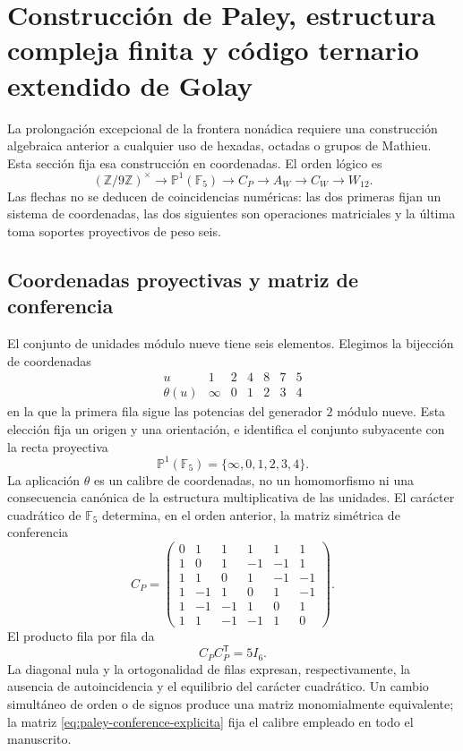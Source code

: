 \chapter{Construcción de Paley, estructura compleja finita y código ternario
extendido de Golay}
\label{chap:paley-codigo-witt}

La prolongación excepcional de la frontera nonádica requiere una construcción
algebraica anterior a cualquier uso de hexadas, octadas o grupos de Mathieu.
Esta sección fija esa construcción en coordenadas. El orden lógico es
\[
 (\mathbb Z/9\mathbb Z)^\times
 \longrightarrow \mathbb P^1(\mathbb F_5)
 \longrightarrow C_P
 \longrightarrow A_W
 \longrightarrow C_W
 \longrightarrow W_{12}.
\]
Las flechas no se deducen de coincidencias numéricas: las dos primeras fijan
un sistema de coordenadas, las dos siguientes son operaciones matriciales y la
última toma soportes proyectivos de peso seis.

\section{Coordenadas proyectivas y matriz de conferencia}

El conjunto de unidades módulo nueve tiene seis elementos. Elegimos la
bijección de coordenadas
\[
\begin{array}{c|cccccc}
u&1&2&4&8&7&5\\ \hline
\theta(u)&\infty&0&1&2&3&4
\end{array}
\]
en la que la primera fila sigue las potencias del generador \(2\) módulo
nueve. Esta elección fija un origen y una orientación, e identifica el
conjunto subyacente con la recta proyectiva
\[
 \mathbb P^1(\mathbb F_5)=\{\infty,0,1,2,3,4\}.
\]
La aplicación \(\theta\) es un calibre de coordenadas, no un homomorfismo ni
una consecuencia canónica de la estructura multiplicativa de las unidades.
El carácter cuadrático de \(\mathbb F_5\) determina, en el orden anterior, la
matriz simétrica de conferencia
\begin{equation}
 C_P=
 \begin{pmatrix}
 0& 1& 1& 1& 1& 1\\
 1& 0& 1&-1&-1& 1\\
 1& 1& 0& 1&-1&-1\\
 1&-1& 1& 0& 1&-1\\
 1&-1&-1& 1& 0& 1\\
 1& 1&-1&-1& 1& 0
 \end{pmatrix}.
 \label{eq:paley-conference-explicita}
\end{equation}
El producto fila por fila da
\begin{equation}
 C_PC_P^{\mathsf T}=5I_6.
 \label{eq:paley-conference-identidad}
\end{equation}
La diagonal nula y la ortogonalidad de filas expresan, respectivamente, la
ausencia de autoincidencia y el equilibrio del carácter cuadrático. Un cambio
simultáneo de orden o de signos produce una matriz monomialmente equivalente;
la matriz \eqref{eq:paley-conference-explicita} fija el calibre empleado en
todo el manuscrito.


